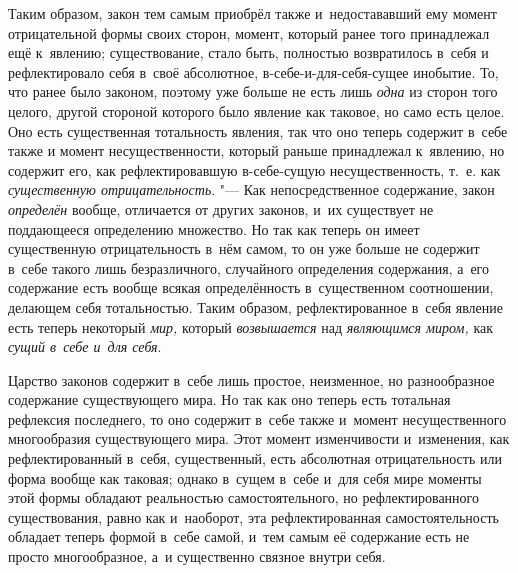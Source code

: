 Таким образом, закон тем самым приобрёл также и~недостававший ему момент
отрицательной формы своих сторон, момент, который ранее того принадлежал
ещё к~явлению; существование, стало быть, полностью возвратилось в~себя и
рефлектировало себя в~своё абсолютное, в-себе-и-для-себя-сущее инобытие.
То, что ранее было законом, поэтому уже больше не есть лишь
{\em одна} из сторон того целого, другой стороной
которого было явление как таковое, но само есть целое. Оно есть
существенная тотальность явления, так что оно теперь содержит в~себе также
и момент несущественности, который раньше принадлежал к~явлению, но
содержит его, как рефлектировавшую в-себе-сущую несущественность, т.~е. как
{\em существенную отрицательность}. "--- Как
непосредственное содержание, закон {\em определён}
вообще, отличается от других законов, и~их существует не поддающееся
определению множество. Но так как теперь он имеет существенную
отрицательность в~нём самом, то он уже больше не содержит в~себе такого
лишь безразличного, случайного определения содержания, а~его содержание
есть вообще всякая определённость в~существенном соотношении, делающем себя
тотальностью. Таким образом, рефлектированное в~себя явление есть теперь
некоторый {\em мир,} который
{\em возвышается} над
{\em являющимся миром,} как
{\em сущий в~себе и~для себя}.

Царство законов содержит в~себе лишь простое, неизменное, но разнообразное
содержание существующего мира. Но так как оно теперь есть тотальная
рефлексия последнего, то оно содержит в~себе также и~момент несущественного
многообразия существующего мира. Этот момент изменчивости и~изменения, как
рефлектированный в~себя, существенный, есть абсолютная отрицательность или
форма вообще как таковая; однако в~сущем в~себе и~для себя мире моменты
этой формы обладают реальностью самостоятельного, но рефлектированного
существования, равно как и~наоборот, эта рефлектированная самостоятельность
обладает теперь формой в~себе самой, и~тем самым её содержание есть не
просто многообразное, а~и существенно связное внутри себя.

